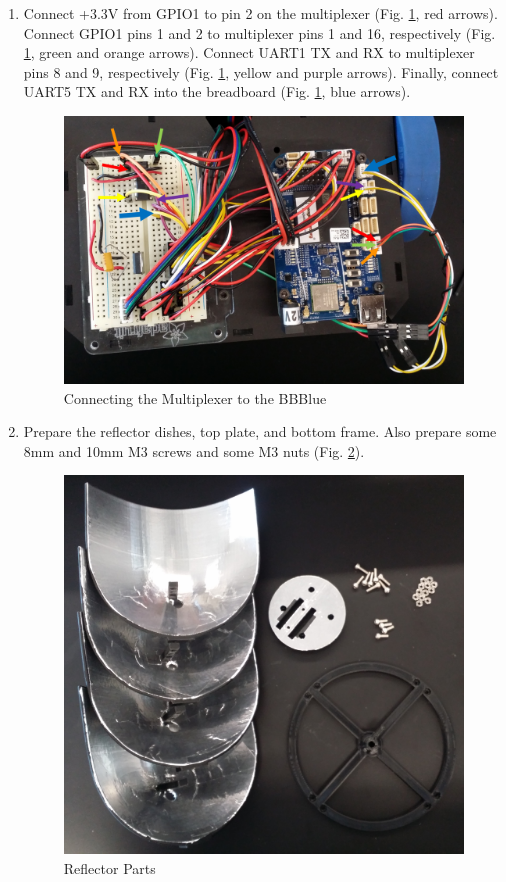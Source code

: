 \begin{enumerate}[label = \textbf{Step \arabic*.}]
    \item Connect +3.3V from GPIO1 to pin 2 on the multiplexer (Fig. \ref{fig:multiplexerWiring}, red arrows). Connect GPIO1 pins 1 and 2 to multiplexer pins 1 and 16, respectively (Fig. \ref{fig:multiplexerWiring}, green and orange arrows). Connect UART1 TX and RX to multiplexer pins 8 and 9, respectively (Fig. \ref{fig:multiplexerWiring}, yellow and purple arrows). Finally, connect UART5 TX and RX into the breadboard (Fig. \ref{fig:multiplexerWiring}, blue arrows).
    \begin{figure}[H]
        \centering
        \includegraphics[width=4.8in]{figs/img/assembly/11-multiplexerBBBlueWiring.png}
        \caption{Connecting the Multiplexer to the BBBlue}
        \label{fig:multiplexerWiring}
    \end{figure}
    \pagebreak

    \item Prepare the reflector dishes, top plate, and bottom frame. Also prepare some 8mm and 10mm M3 screws and some M3 nuts (Fig. \ref{fig:reflectorParts}).
    \begin{figure}[H]
        \centering
        \includegraphics[width=4.4in]{figs/img/assembly/12-reflectorParts.jpg}
        \caption{Reflector Parts}
        \label{fig:reflectorParts}
    \end{figure}


\end{enumerate}
